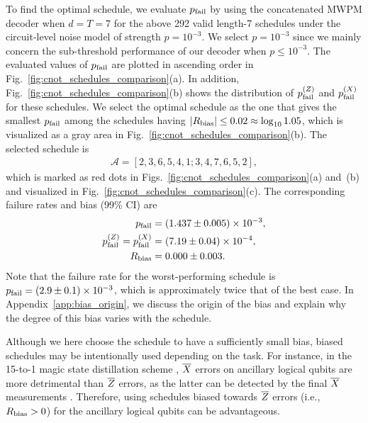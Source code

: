 \documentclass[a4paper,twocolumn,11pt,accepted=2025-01-21]{quantumarticle}
\theoremstyle{definition}
\theoremstyle{definition}
\theoremstyle{definition}
\begin{document}
To find the optimal \cnot schedule, we evaluate $p_{\mathrm{fail}}$ by using the concatenated MWPM decoder when $d=T=7$ for the above 292 valid length-7 \cnot schedules under the circuit-level noise model of strength $p = 10^{-3}$.
We select $p = 10^{-3}$ since we mainly concern the sub-threshold performance of our decoder when $p \leq 10^{-3}$.
The evaluated values of $p_{\mathrm{fail}}$ are plotted in ascending order in Fig.~\ref{fig:cnot_schedules_comparison}(a).
In addition, Fig.~\ref{fig:cnot_schedules_comparison}(b) shows the distribution of $p_{\mathrm{fail}}^{(Z)}$ and $p_{\mathrm{fail}}^{(X)}$ for these schedules.
We select the optimal \cnot schedule as the one that gives the smallest $p_{\mathrm{fail}}$ among the schedules having $\abs{R_{\mathrm{bias}}} \leq 0.02 \approx \log_{10} 1.05$, which is visualized as a gray area in Fig.~\ref{fig:cnot_schedules_comparison}(b).
The selected \cnot schedule is
\begin{align}
    \mathcal{A} = [2, 3, 6, 5, 4, 1; 3, 4, 7, 6, 5, 2],
    \label{eq:optimal_cnot_schedule}
\end{align}
which is marked as red dots in Figs.~\ref{fig:cnot_schedules_comparison}(a) and~(b) and visualized in Fig.~\ref{fig:cnot_schedules_comparison}(c).
The corresponding failure rates and bias (99\% CI) are
\begin{align*}
    p_{\mathrm{fail}} ={}& (1.437 \pm 0.005) \times 10^{-3}, \\
    p_{\mathrm{fail}}^{(Z)} = p_{\mathrm{fail}}^{(X)} ={}& (7.19 \pm 0.04) \times 10^{-4}, \\
    R_{\mathrm{bias}} ={}& 0.000 \pm 0.003.
\end{align*}
Note that the failure rate for the worst-performing \cnot schedule is $p_{\mathrm{fail}} = (2.9 \pm 0.1) \times 10^{-3}$, which is approximately twice that of the best case.
In Appendix~\ref{app:bias_origin}, we discuss the origin of the bias and explain why the degree of this bias varies with the \cnot schedule.

Although we here choose the schedule to have a sufficiently small bias, biased schedules may be intentionally used depending on the task.
For instance, in the 15-to-1 magic state distillation scheme \cite{bravyi2005universal}, $\overline{X}$ errors on ancillary logical qubits are more detrimental than $\overline{Z}$ errors, as the latter can be detected by the final $\overline{X}$ measurements \cite{litinski2019magic}.
Therefore, using \cnot schedules biased towards $\overline{Z}$ errors (i.e., $R_{\mathrm{bias}} > 0$) for the ancillary logical qubits can be advantageous.

\end{document}
